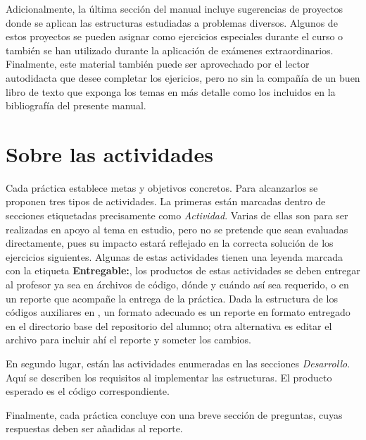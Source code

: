 Adicionalmente, la última sección del manual incluye sugerencias de proyectos donde se aplican las estructuras estudiadas a problemas diversos.  Algunos de estos proyectos se pueden asignar como ejercicios especiales durante el curso o también se han utilizado durante la aplicación de exámenes extraordinarios.  Finalmente, este material también puede ser aprovechado por el lector autodidacta que desee completar los ejericios, pero no sin la compañía de un buen libro de texto que exponga los temas en más detalle como los incluidos en la bibliografía del presente manual.

\section*{Sobre las actividades}

Cada práctica establece metas y objetivos concretos.  Para alcanzarlos se proponen tres tipos de actividades.  La primeras están marcadas dentro de secciones etiquetadas precisamente como \emph{Actividad}.  Varias de ellas son para ser realizadas en apoyo al tema en estudio, pero no se pretende que sean evaluadas directamente, pues su impacto estará reflejado en la correcta solución de los ejercicios siguientes.  Algunas de estas actividades tienen una leyenda marcada con la etiqueta \textbf{Entregable:}, los productos de estas actividades se deben entregar al profesor ya sea en árchivos de código, dónde y cuándo así sea requerido, o en un reporte que acompañe la entrega de la práctica.  Dada la estructura de los códigos auxiliares en , un formato adecuado es un reporte en formato  entregado en el directorio base del repositorio del alumno; otra alternativa es editar el archivo  para incluir ahí el reporte y someter los cambios.

En segundo lugar, están las actividades enumeradas en las secciones \emph{Desarrollo}.  Aquí se describen los requisitos al implementar las estructuras.  El producto esperado es el código correspondiente.

Finalmente, cada práctica concluye con una breve sección de preguntas, cuyas respuestas deben ser añadidas al reporte.
